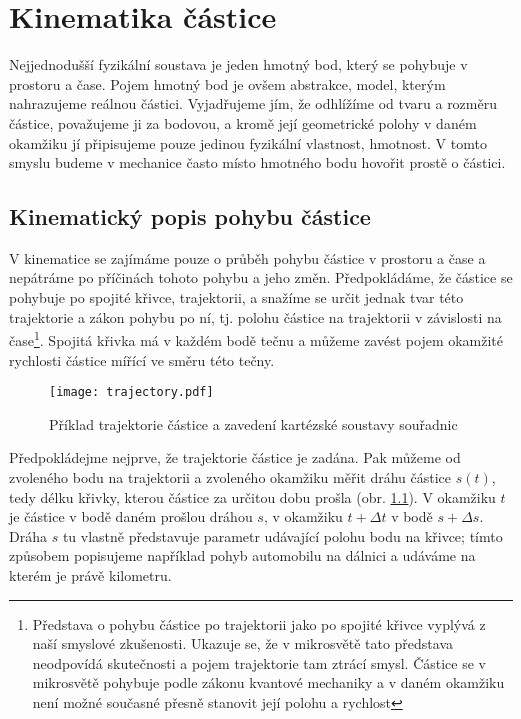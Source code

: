 \chapter{Kinematika částice}
\minitoc
\newpage
  Nejjednodušší fyzikální soustava je jeden hmotný bod, který se pohybuje v prostoru a čase. Pojem
  hmotný bod je ovšem abstrakce, model, kterým nahrazujeme reálnou částici. Vyjadřujeme jím, že
  odhlížíme od tvaru a rozměru částice, považujeme ji za bodovou, a kromě její geometrické polohy v
  daném okamžiku jí připisujeme pouze jedinou fyzikální vlastnost, hmotnost. V tomto smyslu budeme
  v mechanice často místo hmotného bodu hovořit prostě o částici.
  \section{Kinematický popis pohybu částice}
    V kinematice se zajímáme pouze o průběh pohybu částice v prostoru a čase a nepátráme po
    příčinách tohoto pohybu a jeho změn. Předpokládáme, že částice se pohybuje po spojité křivce,
    trajektorii, a snažíme se určit jednak tvar této trajektorie a zákon pohybu po ní, tj. polohu
    částice na trajektorii v závislosti na čase\footnote{Představa o pohybu částice po trajektorii
    jako po spojité křivce vyplývá z naší smyslové zkušenosti. Ukazuje se, že v mikrosvětě tato
    představa neodpovídá skutečnosti a pojem trajektorie tam ztrácí smysl. Částice se v mikrosvětě
    pohybuje podle zákonu kvantové mechaniky a v daném okamžiku není možné současné přesně stanovit
    její polohu a rychlost}. Spojitá křivka má v každém bodě tečnu a můžeme zavést pojem okamžité
    rychlosti částice mířící ve směru této tečny.
  
    \begin{figure}[ht!]
      \centering
      \texttt{[image: trajectory.pdf]}
      \caption{Příklad trajektorie částice a zavedení kartézské soustavy souřadnic}
      \label{mech:fig_trjctr}
    \end{figure}
  
    Předpokládejme nejprve, že trajektorie částice je zadána. Pak můžeme od zvoleného bodu na
    trajektorii a zvoleného okamžiku měřit dráhu částice $s(t)$, tedy délku křivky, kterou částice
    za určitou dobu prošla (obr. \ref{mech:fig_trjctr}). V okamžiku $t$ je částice v bodě daném
    prošlou dráhou $s$, v okamžiku $t + \Delta t$ v bodě $s + \Delta s$. Dráha $s$ tu vlastně
    představuje parametr udávající polohu bodu na křivce; tímto způsobem popisujeme například pohyb
    automobilu na dálnici a udáváme na kterém je právě kilometru.
  

